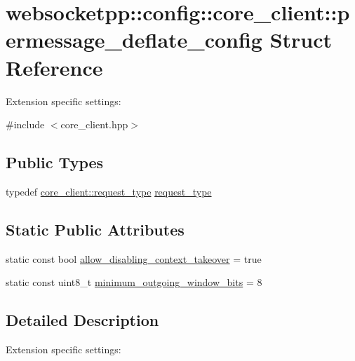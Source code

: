 \hypertarget{structwebsocketpp_1_1config_1_1core__client_1_1permessage__deflate__config}{}\section{websocketpp\+:\+:config\+:\+:core\+\_\+client\+:\+:permessage\+\_\+deflate\+\_\+config Struct Reference}
\label{structwebsocketpp_1_1config_1_1core__client_1_1permessage__deflate__config}


Extension specific settings\+:  




{\ttfamily \#include $<$core\+\_\+client.\+hpp$>$}

\subsection*{Public Types}
\begin{DoxyCompactItemize}
\item 
typedef \hyperlink{structwebsocketpp_1_1config_1_1core__client_a1fd74b16e3add246b1c356f6f14f206b}{core\+\_\+client\+::request\+\_\+type} \hyperlink{structwebsocketpp_1_1config_1_1core__client_1_1permessage__deflate__config_ad232507a23e7a2c6c70ae631dc87b80d}{request\+\_\+type}
\end{DoxyCompactItemize}
\subsection*{Static Public Attributes}
\begin{DoxyCompactItemize}
\item 
static const bool \hyperlink{structwebsocketpp_1_1config_1_1core__client_1_1permessage__deflate__config_ab7cbd54d076521a3edf75bb44144d676}{allow\+\_\+disabling\+\_\+context\+\_\+takeover} = true
\item 
static const uint8\+\_\+t \hyperlink{structwebsocketpp_1_1config_1_1core__client_1_1permessage__deflate__config_a0ac8d0ba3a5fcc0220cd282b2e18242c}{minimum\+\_\+outgoing\+\_\+window\+\_\+bits} = 8
\end{DoxyCompactItemize}


\subsection{Detailed Description}
Extension specific settings\+: 

